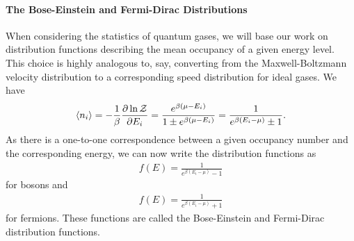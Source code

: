 \paragraph{The Bose-Einstein and Fermi-Dirac Distributions}
When considering the statistics of quantum gases, we will base our work on distribution functions describing the mean occupancy of a given energy level. This choice is highly analogous to, say, converting from the Maxwell-Boltzmann velocity distribution to a corresponding speed distribution for ideal gases. We have
\begin{align*}
	\expval{n_{i}} = -\frac{1}{\beta}\pdv{\ln{\mathcal{Z}}}{E_{i}} = \frac{e^{\beta(\mu - E_{i})}}{1 \pm e^{\beta(\mu - E_{i})}} = \frac{1}{e^{\beta(E_{i} - \mu)} \pm 1}.
\end{align*}
As there is a one-to-one correspondence between a given occupancy number and the corresponding energy, we can now write the distribution functions as
\begin{align*}
	f(E) = \frac{1}{e^{\beta(E_{i} - \mu)} - 1}
\end{align*}
for bosons and
\begin{align*}
	f(E) = \frac{1}{e^{\beta(E_{i} - \mu)} + 1}
\end{align*}
for fermions. These functions are called the Bose-Einstein and Fermi-Dirac distribution functions.